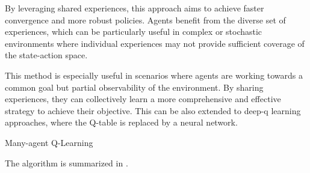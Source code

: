 By leveraging shared experiences, 
 this approach aims to achieve faster convergence and more robust policies. 
 Agents benefit from the diverse set of experiences, which can be particularly useful in complex or stochastic environments where individual experiences may not provide sufficient coverage of the state-action space.
  
This method is especially useful in scenarios where agents are working towards a common goal but partial observability of the environment. 
 By sharing experiences, 
 they can collectively learn a more comprehensive and effective strategy to achieve their objective.
%
This can be also extended to deep-q learning approaches, 
 where the Q-table is replaced by a neural network.
%
\begin{algorithm}
\caption{Many-agent Q-Learning}
\label{alg:maql}
\DontPrintSemicolon
{}
\end{algorithm}
The algorithm is summarized in .
